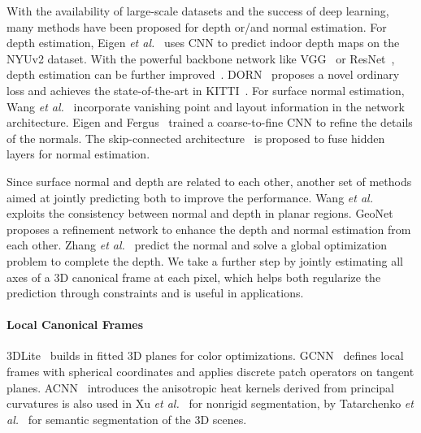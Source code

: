 With the availability of large-scale datasets and the success of deep learning, many methods have been proposed for depth or/and normal estimation. For depth estimation, Eigen \textit{et al.}~\cite{eigen2014depth} uses CNN to predict indoor depth maps on the NYUv2 dataset. With the powerful backbone network like VGG~\cite{simonyan2014very} or ResNet~\cite{he2016deep}, depth estimation can be further improved~\cite{garg2016unsupervised,xie2016deep3d}. DORN~\cite{fu2018deep} proposes a novel ordinary loss and achieves the state-of-the-art in KITTI~\cite{geiger2013vision}. For surface normal estimation, Wang \textit{et al.}~\cite{wang2015designing} incorporate vanishing point and layout information in the network architecture. Eigen and Fergus~\cite{eigen2015predicting} trained a coarse-to-fine CNN to refine the details of the normals. The skip-connected architecture~\cite{bansal2016marr} is proposed to fuse hidden layers for normal estimation.

Since surface normal and depth are related to each other, another set of methods aimed at jointly predicting both to improve the performance. Wang \textit{et al.}~\cite{wang2016surge} exploits the consistency between normal and depth in planar regions. GeoNet~\cite{qi2018geonet} proposes a refinement network to enhance the depth and normal estimation from each other. Zhang \textit{et al.}~\cite{zhang2018deep} predict the normal and solve a global optimization problem to complete the depth.  We take a further step by jointly estimating all axes of a 3D canonical frame at each pixel, which helps both regularize the prediction through constraints and is useful in applications.

\paragraph*{Local Canonical Frames}
 3DLite~\cite{huang20173dlite} builds \cframe{} in fitted 3D planes for color optimizations. GCNN~\cite{masci2015geodesic} defines local frames with spherical coordinates and applies discrete patch operators on tangent planes. ACNN~\cite{boscaini2016learning} introduces the anisotropic heat kernels derived from principal curvatures  is also used in Xu \textit{et al.}~\cite{xu2017directionally} for nonrigid segmentation, by Tatarchenko \textit{et al.}~\cite{tatarchenko2018tangent,huang2018texturenet} for semantic segmentation of the 3D scenes. 

